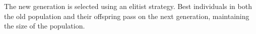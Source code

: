 The new generation is selected using an elitist strategy. Best individuals in both the old population and their offspring pass on the next generation, maintaining the size of the population.



